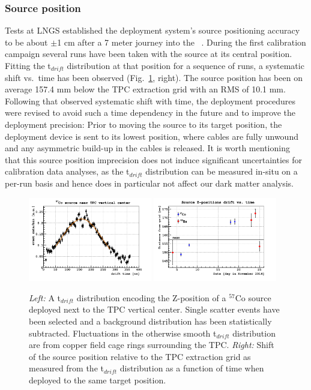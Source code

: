 \subsubsection{Source position}
Tests at LNGS established the deployment system's source positioning accuracy to be about $\pm$1 cm after a 7 meter journey into the \dsf\ \lsv.
During the first calibration campaign several runs have been taken with the source at its central position. %
Fitting the t$_{drift}$ distribution at that position for a sequence of runs, a systematic shift vs.~time has been observed (Fig.~\ref{fig:SourcePosition}, right). The source position has been on average 157.4 mm below the TPC extraction grid with an RMS of 10.1 mm. Following that observed systematic shift with time, the deployment procedures were revised to avoid such a time dependency in the future and to improve the deployment precision: Prior to moving the source to its target position, the deployment device is sent to its lowest position, where cables are fully unwound and any asymmetric build-up in the cables is released. It is worth mentioning that this source position imprecision does not induce significant uncertainties for calibration data analyses, as the t$_{drift}$ distribution can be measured in-situ on a per-run basis and hence does in particular not affect our dark matter analysis.
\begin{figure}[htbp]
\centering
\includegraphics[width=0.48\textwidth]{./Figures/Tdrift_distribution_Co57.png}
\includegraphics[width=0.48\textwidth]{./Figures/SourcePosition_vs_time.png}
\caption{\textit{Left:} A t$_{drift}$ distribution encoding the Z-position of a $^{57}$Co source deployed next to the TPC vertical center. Single scatter events have been selected and a background distribution has been statistically subtracted. Fluctuations in the otherwise smooth t$_{drift}$ distribution are from copper field cage rings surrounding the TPC.
\textit{Right:} Shift of the source position relative to the TPC extraction grid as measured from the t$_{drift}$ distribution as a function of time when deployed to the same target position.
\label{fig:SourcePosition}} 
\end{figure}

